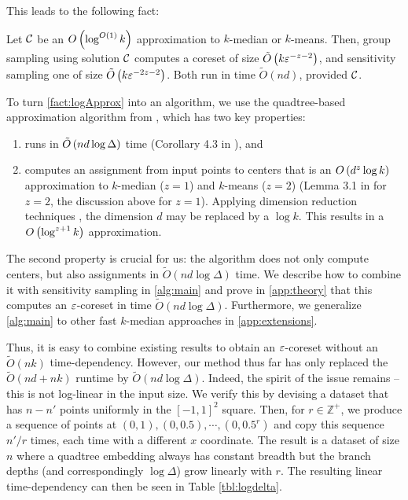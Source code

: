 This leads to the following fact:
\begin{fact}\label{fact:logApprox}
Let $\mathcal C$ be an $O\left( \log^{O(1)} k\right)$ approximation to $k$-median or $k$-means.
Then, group sampling using solution $\mathcal C$ computes a coreset of size $\tilde O\left(
k \varepsilon^{-z-2}\right)$, and sensitivity sampling one of size $\tilde O\left( k \varepsilon^{-2z-2}\right)$. 
Both run in time $\tilde O(nd)$, provided $\mathcal C$.
\end{fact}

To turn \cref{fact:logApprox} into an algorithm, we use the quadtree-based \fkmeans approximation algorithm from \cite{cohen2020fast}, which has two key
properties: 
\begin{enumerate}
\item \fkmeans runs in $\tilde O\left( n d \log \Delta\right)$ time (Corollary 4.3 in \cite{cohen2020fast}), and
\item \fkmeans computes an assignment from input points to centers that is an $O\left( d^z \log k\right)$ approximation to $k$-median ($z=1$) and $k$-means ($z=2$)
    (Lemma 3.1 in \cite{cohen2020fast} for $z=2$, the discussion above for $z=1$). Applying dimension reduction techniques \cite{MakarychevMR19}, the dimension
    $d$ may be replaced by a $\log k$. This results in a $O\left(\log^{z+1} k\right)$ approximation.
\end{enumerate}

The second property is crucial for us: the algorithm does not only compute centers, but also assignments in $\tilde{O}(nd\log \Delta)$ time.  We describe how to
combine it with sensitivity sampling in \cref{alg:main} and prove in \cref{app:theory} that this computes an $\varepsilon$-coreset in time $\tilde O(nd \log \Delta)$.
Furthermore, we generalize \cref{alg:main} to other fast $k$-median approaches in \cref{app:extensions}.

Thus, it is easy to combine existing results to obtain an $\varepsilon$-coreset without an $\tilde{O}(nk)$ time-dependency.  However, our method thus far has only
replaced the $\tilde{O}(nd + nk)$ runtime by $\tilde{O}(nd \log \Delta)$. Indeed, the spirit of the issue remains -- this is not log-linear in the input size.
We verify this by devising a dataset that has $n - n'$ points uniformly in the $[-1, 1]^2$ square. Then, for $r \in \mathbb{Z}^+$, we produce a sequence of
points at $(0, 1), (0, 0.5), \cdots, (0, 0.5^r)$ and copy this sequence $n' / r$ times, each time with a different $x$ coordinate. The result is a dataset of
size $n$ where a quadtree embedding always has constant breadth but the branch depths (and correspondingly $\log \Delta$) grow linearly with $r$. The resulting
linear time-dependency can then be seen in Table \ref{tbl:logdelta}.

